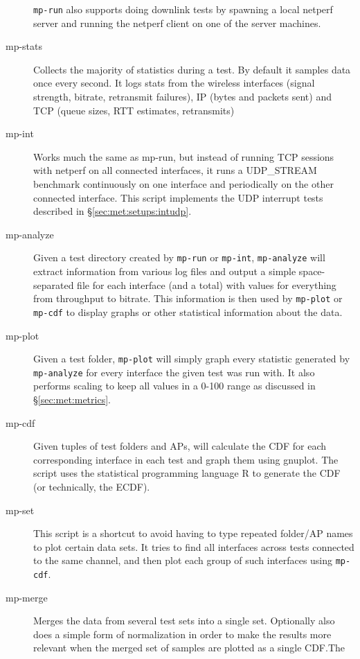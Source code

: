 \begin{description}
    \texttt{mp-run} also supports doing downlink tests by spawning a local
    netperf server and running the netperf client on one of the server machines.
  \item[mp-stats]
    Collects the majority of statistics during a test. By default it samples
    data once every second. It logs stats from the wireless interfaces (signal
    strength, bitrate, retransmit failures), IP (bytes and packets sent) and TCP
    (queue sizes, RTT estimates, retransmits)
  \item[mp-int]
    Works much the same as mp-run, but instead of running TCP sessions with
    netperf on all connected interfaces, it runs a UDP\_STREAM benchmark continuously
    on one interface and periodically on the other connected interface. This
    script implements the UDP interrupt tests described in
    \S\ref{sec:met:setups:intudp}.
  \item[mp-analyze]
    Given a test directory created by \texttt{mp-run} or \texttt{mp-int},
    \texttt{mp-analyze} will extract information from various log files and
    output a simple space-separated file for each interface (and a total) with
    values for everything from throughput to bitrate. This information is then
    used by \texttt{mp-plot} or \texttt{mp-cdf} to display graphs or other
    statistical information about the data.
  \item[mp-plot]
    Given a test folder, \texttt{mp-plot} will simply graph every statistic
    generated by \texttt{mp-analyze} for every interface the given test was run
    with. It also performs scaling to keep all values in a 0-100 range as
    discussed in \S\ref{sec:met:metrics}.
  \item[mp-cdf]
    Given tuples of test folders and APs, will calculate the CDF for each
    corresponding interface in each test and graph them using gnuplot. The
    script uses the statistical programming language R to generate the CDF (or
    technically, the ECDF).
  \item[mp-set]
    This script is a shortcut to avoid having to type repeated folder/AP
    names to plot certain data sets. It tries to find all interfaces across
    tests connected to the same channel, and then plot each group of such
    interfaces using \texttt{mp-cdf}.
  \item[mp-merge]
    Merges the data from several test sets into a single set. Optionally also
    does a simple form of normalization in order to make the results more
    relevant when the merged set of samples are plotted as a single CDF.\@ The

\end{description}
